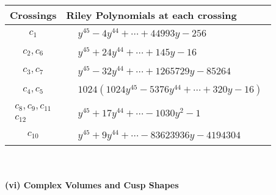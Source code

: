 \documentclass[1p]{elsarticle_modified}
\theoremstyle{definition}
\begin{document}
\begin{tabular}{m{50pt}|m{274pt}}
Crossings & \hspace{64pt}Riley Polynomials at each crossing \\
\hline $$\begin{aligned}c_{1}\end{aligned}$$&$\begin{aligned}
&y^{45}-4 y^{44}+\cdots+44993 y-256
\end{aligned}$\\
\hline $$\begin{aligned}c_{2},c_{6}\end{aligned}$$&$\begin{aligned}
&y^{45}+24 y^{44}+\cdots+145 y-16
\end{aligned}$\\
\hline $$\begin{aligned}c_{3},c_{7}\end{aligned}$$&$\begin{aligned}
&y^{45}-32 y^{44}+\cdots+1265729 y-85264
\end{aligned}$\\
\hline $$\begin{aligned}c_{4},c_{5}\end{aligned}$$&$\begin{aligned}
&1024(1024 y^{45}-5376 y^{44}+\cdots+320 y-16)
\end{aligned}$\\
\hline $$\begin{aligned}c_{8},c_{9},c_{11}\\c_{12}\end{aligned}$$&$\begin{aligned}
&y^{45}+17 y^{44}+\cdots-1030 y^2-1
\end{aligned}$\\
\hline $$\begin{aligned}c_{10}\end{aligned}$$&$\begin{aligned}
&y^{45}+9 y^{44}+\cdots-83623936 y-4194304
\end{aligned}$\\
\hline
\end{tabular}\\~\\
\newpage\flushleft \textbf{(vi) Complex Volumes and Cusp Shapes}
\end{document}
